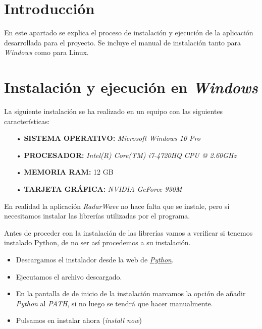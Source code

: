 
\section{Introducción}

En este apartado se explica el proceso de instalación y ejecución de la aplicación desarrollada para el proyecto. Se incluye el manual de instalación tanto para \textit{Windows} como para {Linux}.

\section{Instalación y ejecución en \textit{Windows}} \label{sec:windows}

La siguiente instalación se ha realizado en un equipo con las siguientes características:
\begin{itemize}
\item[•] \textbf{SISTEMA OPERATIVO:} \textit{Microsoft Windows 10 Pro}
\item[•] \textbf{PROCESADOR:} \textit{Intel(R) Core(TM) i7-4720HQ CPU @ 2.60GHz}
\item[•] \textbf{MEMORIA RAM:} 12 GB
\item[•] \textbf{TARJETA GRÁFICA:} \textit{NVIDIA GeForce 930M}
\end{itemize}

En realidad la aplicación \textit{RadarWave} no hace falta que se instale, pero si necesitamos instalar las librerías utilizadas por el programa.

Antes de proceder con la instalación de las librerías vamos a verificar si tenemos instalado Python, de no ser así procedemos a su instalación.
\begin{itemize}
\item Descargamos el instalador desde la web de \href{https://www.python.org/downloads/}{\textit{Python}}.
\item Ejecutamos el archivo descargado.
\item En la pantalla de de inicio de la instalación marcamos la opción de añadir \textit{Python} al \textit{PATH}, si no luego se tendrá que hacer manualmente.
\item Pulsamos en instalar ahora (\textit{install now})


\end{itemize}

